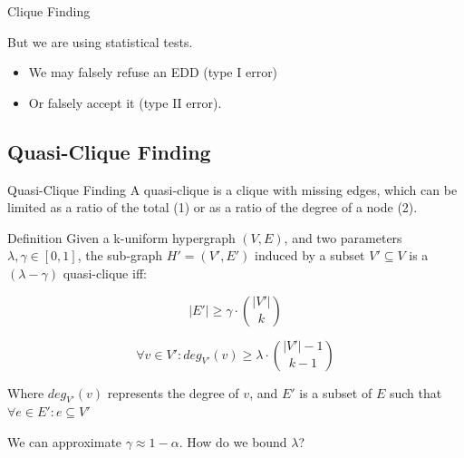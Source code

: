\documentclass[10pt]{beamer}
\begin{document}
\begin{frame}{Clique Finding}
    \pause
    
    \begin{alertblock}{}
    But we are using statistical tests.
    
    \begin{itemize}
        \item We may falsely refuse an EDD (type I error)
        \item Or falsely accept it (type II error).
    \end{itemize}
    \end{alertblock}
\end{frame}


\subsection{Quasi-Clique Finding}
\begin{frame}{Quasi-Clique Finding}
    A quasi-clique is a clique with missing edges, which can be limited as a ratio of the total (1)
    or as a ratio of the degree of a node (2).

    \begin{alertblock}{Definition}
    Given a k-uniform hypergraph $(V,E)$, and two parameters $\lambda, \gamma \in [0,1]$,
    the sub-graph $H'=(V',E')$ induced by a subset $V' \subseteq V$ is a
    $(\lambda-\gamma)$ quasi-clique iff:
    
    \begin{equation}
        |E'| \ge \gamma \cdot \binom{|V'|}{k}
        \label{eq:edge_hyperclique}
    \end{equation}
    
    \begin{equation}
        \forall v \in V': deg_{V'}(v) \ge \lambda \cdot \binom{|V'| - 1}{k - 1}
        \label{eq:deg_hyperclique}
    \end{equation}

    Where $deg_{V'}(v)$ represents the degree of $v$, and $E'$ is a subset of $E$ such that
    $\forall e \in E' : e \subseteq V'$
    \end{alertblock}
    
    We can approximate $\gamma \approx 1 - \alpha$. How do we bound $\lambda$?
\end{frame}
\end{document}
